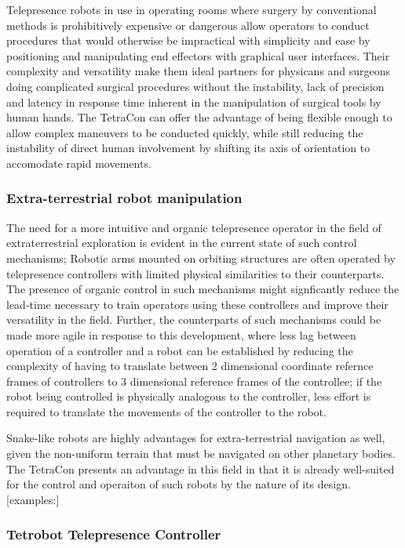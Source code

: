 \documentclass[11pt]{article}
\begin{document}
 Telepresence robots in use in operating rooms where surgery by conventional methods is prohibitively expensive or dangerous allow operators to conduct procedures that would otherwise be impractical with simplicity and ease by positioning and manipulating end effectors with graphical user interfaces. Their complexity and versatility make them ideal partners for physicans and surgeons doing complicated surgical procedures without the instability, lack of precision and latency in response time inherent in the manipulation of surgical tools by human hands. The TetraCon can offer the advantage of being flexible enough to allow complex maneuvers to be conducted quickly, while still reducing the instability of direct human involvement by shifting its axis of orientation to accomodate rapid movements. 

\subsubsection{Extra-terrestrial robot manipulation}

The need for a more intuitive and organic telepresence operator in the field of extraterrestrial exploration is evident in the current state of such control mechanisms; Robotic arms mounted on orbiting structures are often operated by telepresence controllers with limited physical similarities to their counterparts. The presence of organic control in such mechanisms might signficantly reduce the lead-time necessary to train operators using these controllers and improve their versatility in the field. Further, the counterparts of such mechanisms could be made more agile in response to this development, where less lag between operation of a controller and a robot can be established by reducing the complexity of having to translate between 2 dimensional coordinate refernce frames of controllers to 3 dimensional reference frames of the controllee; if the robot being controlled is physically analogous to the controller, less effort is required to translate the movements of the controller to the robot.

Snake-like robots are highly advantages for extra-terrestrial navigation as well, given the non-uniform terrain that must be navigated on other planetary bodies. The TetraCon presents an advantage in this field in that it is already well-suited for the control and operaiton of such robots by the nature of its design. [examples:] 
\subsubsection{Tetrobot Telepresence Controller}
\end{document}
